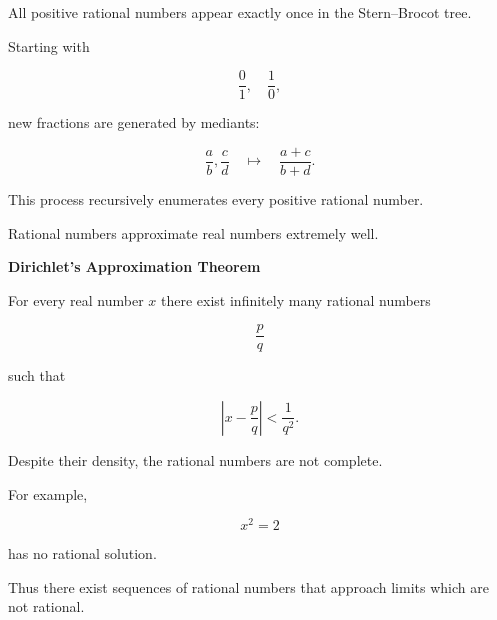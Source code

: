 \begin{tcolorbox}[colback=gray!6, colframe=gray!40, arc=2pt,
title={Stern--Brocot Tree}]

All positive rational numbers appear exactly once in the
Stern--Brocot tree.

Starting with

\[
\frac{0}{1},\quad\frac{1}{0},
\]

new fractions are generated by mediants:

\[
\frac{a}{b},\frac{c}{d}
\quad\mapsto\quad
\frac{a+c}{b+d}.
\]

This process recursively enumerates every positive rational number.

\end{tcolorbox}

\begin{exposition}
\medskip
\end{exposition}


\begin{tcolorbox}[colback=gray!6, colframe=gray!40, arc=2pt,
title={Rational Approximation}]

Rational numbers approximate real numbers extremely well.

\textbf{Dirichlet's Approximation Theorem}

For every real number $x$ there exist infinitely many rational numbers

\[
\frac{p}{q}
\]

such that

\[
\left|x-\frac{p}{q}\right|
<
\frac{1}{q^{2}}.
\]

\end{tcolorbox}

\begin{exposition}
\medskip
\end{exposition}


\begin{tcolorbox}[colback=gray!6, colframe=gray!40, arc=2pt,
title={Gaps in $\mathbb{Q}$}]

Despite their density, the rational numbers are not complete.

For example,

\[
x^{2}=2
\]

has no rational solution.

Thus there exist sequences of rational numbers that approach
limits which are not rational.

\end{tcolorbox}

